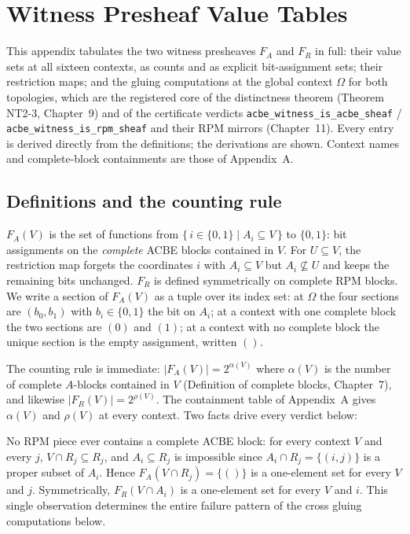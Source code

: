 \chapter{Witness Presheaf Value Tables}
\label{appC:chapter}

This appendix tabulates the two witness presheaves $F_A$ and $F_R$ in
full: their value sets at all sixteen contexts, as counts and as explicit
bit-assignment sets; their restriction maps; and the gluing computations
at the global context $\Omega$ for both topologies, which are the
registered core of the distinctness theorem (Theorem NT2-3, Chapter~9)
and of the
certificate verdicts
\texttt{acbe\_witness\_is\_acbe\_sheaf} /
\texttt{acbe\_witness\_is\_rpm\_sheaf} and their RPM mirrors
(Chapter~11). Every entry is derived directly from the definitions; the
derivations are shown. Context names and complete-block containments are
those of Appendix~A.

\section{Definitions and the counting rule}
\label{appC:sec:defs}

\begin{notation}
\label{appC:not:witness}
$F_A(V)$ is the set of functions from
$\{\, i \in \{0,1\} \mid A_i \subseteq V \,\}$ to $\{0, 1\}$: bit
assignments on the \emph{complete} ACBE blocks contained in $V$. For
$U \subseteq V$, the restriction map forgets the coordinates $i$ with
$A_i \subseteq V$ but $A_i \not\subseteq U$ and keeps the remaining bits
unchanged. $F_R$ is defined symmetrically on complete RPM blocks. We
write a section of $F_A(V)$ as a tuple over its index set: at $\Omega$
the four sections are $(b_0, b_1)$ with $b_i \in \{0,1\}$ the bit on
$A_i$; at a context with one complete block the two sections are $(0)$
and $(1)$; at a context with no complete block the unique section is the
empty assignment, written $()$.
\end{notation}

The counting rule is immediate: $|F_A(V)| = 2^{\alpha(V)}$ where
$\alpha(V)$ is the number of complete $A$-blocks contained in $V$
(Definition of complete blocks, Chapter~7), and likewise
$|F_R(V)| = 2^{\rho(V)}$. The containment table of Appendix~A gives
$\alpha(V)$ and $\rho(V)$ at every context. Two facts drive every verdict
below:

\begin{finding}
\label{appC:fnd:novaluecrossing}
No RPM piece ever contains a complete ACBE block: for every context $V$
and every $j$, $V \cap R_j \subseteq R_j$, and $A_i \subseteq R_j$ is
impossible since $A_i \cap R_j = \{(i,j)\}$ is a proper subset of
$A_i$. Hence $F_A(V \cap R_j) = \{()\}$ is a one-element set for every
$V$ and $j$. Symmetrically, $F_R(V \cap A_i)$ is a one-element set for
every $V$ and $i$. This single observation determines the entire
failure pattern of the cross gluing computations below.
\end{finding}

